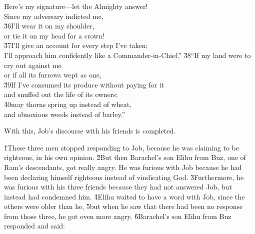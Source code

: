 \begin{poetry}
\poemll    Here's my signature---let the Almighty answer! \\
\poeml Since my adversary indicted me, \\
\poeml \v{36}I'll wear it on my shoulder, \\
\poemlll       or tie it on my head for a crown! \\
\poeml \v{37}I'll give an account for every step I've taken; \\
\poemll    I'll approach him confidently like a Commander-in-Chief.''
\poeml \v{38}``If my land were to cry out against me \\
\poemll    or if all its furrows wept as one, \\
\poeml \v{39}If I've consumed its produce without paying for it \\
\poemll    and snuffed out the life of its owners; \\
\poeml \v{40}may thorns spring up instead of wheat, \\
\poemll    and obnoxious weeds instead of barley.''
\end{poetry}

With this, Job's discourse with his friends is completed.

\v{1}These three men stopped responding to Job, because he was claiming to be righteous, in his own opinion. \v{2}But then Barachel's son Elihu from Buz, one of Ram's descendants, got really angry. He was furious with Job because he had been declaring himself righteous instead of vindicating God. \v{3}Furthermore, he was furious with his three friends because they had not answered Job, but instead had condemned him. \v{4}Elihu waited to have a word with Job, since the others were older than he, \v{5}but when he saw that there had been no response from those three, he got even more angry. \v{6}Barachel's son Elihu from Buz responded and said:

